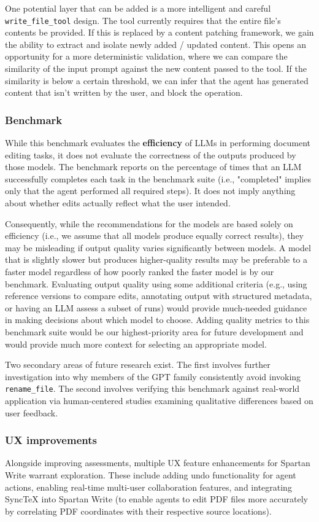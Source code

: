 One potential layer that can be added is a more intelligent and careful \texttt{write\_file\_tool} design.
The tool currently requires that the entire file's contents be provided.
If this is replaced by a content patching framework, we gain the ability to extract and isolate newly added / updated content.
This opens an opportunity for a more deterministic validation, where we can compare the similarity of the input prompt against the new content passed to the tool.
If the similarity is below a certain threshold, we can infer that the agent has generated content that isn't written by the user, and block the operation.

\subsubsection{Benchmark}

While this benchmark evaluates the \textbf{efficiency} of LLMs in performing document editing tasks, it does not evaluate the correctness of the outputs produced by those models.
The benchmark reports on the percentage of times that an LLM successfully completes each task in the benchmark suite (i.e., "completed" implies only that the agent performed all required steps).
It does not imply anything about whether edits actually reflect what the user intended.

Consequently, while the recommendations for the models are based solely on efficiency (i.e., we assume that all models produce equally correct results), they may be misleading if output quality varies significantly between models.
A model that is slightly slower but produces higher-quality results may be preferable to a faster model regardless of how poorly ranked the faster model is by our benchmark.
Evaluating output quality using some additional criteria (e.g., using reference versions to compare edits, annotating output with structured metadata, or having an LLM assess a subset of runs) would provide much-needed guidance in making decisions about which model to choose.
Adding quality metrics to this benchmark suite would be our highest-priority area for future development and would provide much more context for selecting an appropriate model.

Two secondary areas of future research exist.
The first involves further investigation into why members of the GPT family consistently avoid invoking \texttt{rename\_file}.
The second involves verifying this benchmark against real-world application via human-centered studies examining qualitative differences based on user feedback.

\subsubsection{UX improvements}

Alongside improving assessments, multiple UX feature enhancements for Spartan Write warrant exploration.
These include adding undo functionality for agent actions, enabling real-time multi-user collaboration features, and integrating SyncTeX into Spartan Write (to enable agents to edit PDF files more accurately by correlating PDF coordinates with their respective source locations).
